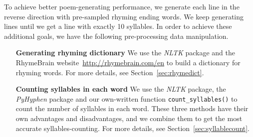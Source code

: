 To achieve better poem-generating performance, we generate each line in the reverse direction with pre-sampled rhyming ending words. We keep generating lines until we get a line with exactly 10 syllables. In order to achieve these additional goals, we have the following pre-processing data manipulation.
\begin{enumerate}
	\item [\textbf{Generating rhyming dictionary}] We use the \textit{NLTK} package and the RhymeBrain website~\url{http://rhymebrain.com/en} to build a dictionary for rhyming words. For more details, see Section~\ref{sec:rhymedict}.
	\item [\textbf{Counting syllables in each word}] We use the \textit{NLTK} package, the \textit{PyHyphen} package and our own-written function \texttt{count\_syllables()} to count the number of syllables in each word. These three methods have their own advantages and disadvantages, and we combine them to get the most accurate syllables-counting. For more details, see Section~\ref{sec:syllablecount}.
\end{enumerate}